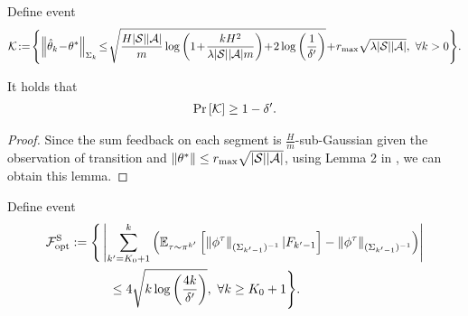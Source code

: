 Define event 
\begin{align}
	\cK\!:=\!\lbr{ \nbr{\hat{\theta}_{k} \!-\! \theta^*}_{\Sigma_{k}} \!\leq\! \sqrt{ \frac{H |\cS||\cA|}{m} \log\sbr{1 \!+\! \frac{kH^2}{\lambda|\cS||\cA|m}} \!+\! 2\log\sbr{\frac{1}{\delta'}} } \!+\! r_{\max}\sqrt{\lambda|\cS||\cA|} ,\  \forall k>0 }\! . \label{eq:concentration_theta_seg}
\end{align}

\begin{lemma} 
	It holds that
	\begin{align*}
		\Pr \left[  \mathcal{K}  \right] \geq 1-\delta' .
	\end{align*}
\end{lemma}
\begin{proof}
	Since the sum feedback on each segment is $\frac{H}{m}$-sub-Gaussian given the observation of transition and $\|\theta^*\|\leq r_{\max}\sqrt{|\mathcal{S}| |\mathcal{A}|}$, using Lemma 2 in \cite{abbasi2011improved}, we can obtain this lemma.
\end{proof}

Define event 
\begin{align}
	&\cF^{\summing}_{\textup{opt}}:=\Bigg\{ \abr{\sum_{k'=K_0+1}^{k} \sbr{ \ex_{\tau \sim \pi^{k'}}\mbr{ \nbr{ \phi^{\tau}}_{(\Sigma_{k'-1})^{-1}} | F_{k'-1}} - \nbr{ \phi^{\tau}}_{(\Sigma_{k'-1})^{-1}} } } 
	\nonumber\\
	&\hspace*{5em} \leq 4\sqrt{ k \log\sbr{\frac{4k}{\delta'}} } ,\ \forall k \geq K_0+1 \Bigg\} . \label{eq:def_martingale}
\end{align}

